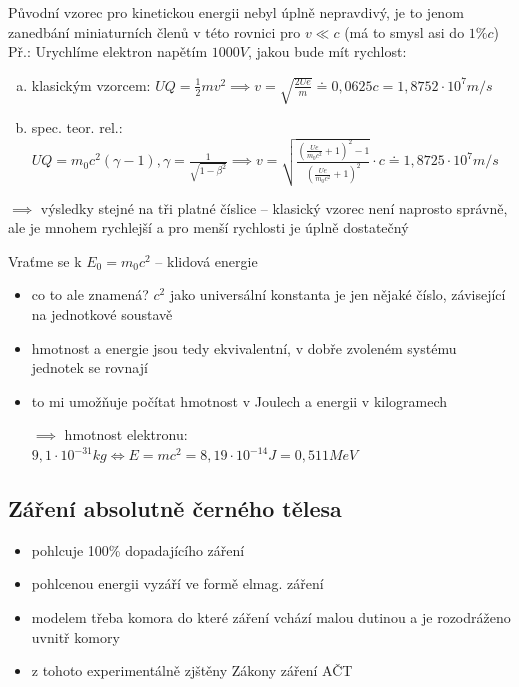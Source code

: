 \documentclass{article}
\begin{document}
Původní vzorec pro kinetickou energii nebyl úplně nepravdivý, je to jenom zanedbání miniaturních členů v této rovnici pro $v \ll c$ (má to smysl asi do $1\% c$)\\

Př.: Urychlíme elektron napětím $1000V$, jakou bude mít rychlost:
\begin{enumerate}[a.]
  \item klasickým vzorcem: $UQ = \frac{1}{2}mv^2 \implies v = \sqrt{\frac{2Ue}{m}} \doteq 0,0625 c = 1,8752 \cdot 10^7 m/s$
  \item spec. teor. rel.: $UQ = m_0 c^2 (\gamma - 1), \gamma = \frac{1}{\sqrt{1-\beta^2}} \implies v = \sqrt{\frac{(\frac{Ue}{m_0 c^2}+1)^2-1}{(\frac{Ue}{m_0 c^2}+1)^2}} \cdot c \doteq 1,8725 \cdot 10^7 m/s$
\end{enumerate}
$\implies$ výsledky stejné na tři platné číslice -- klasický vzorec není naprosto správně, ale je mnohem rychlejší a pro menší rychlosti je úplně dostatečný
\pagebreak

Vraťme se k $E_0 = m_0 c^2$ -- klidová energie
\begin{itemize}
  \item co to ale znamená? $c^2$ jako universální konstanta je jen nějaké číslo, závisející na jednotkové soustavě
  \item hmotnost a energie jsou tedy ekvivalentní, v dobře zvoleném systému jednotek se rovnají
  \item to mi umožňuje počítat hmotnost v Joulech a energii v kilogramech
  \item[$\implies$] hmotnost elektronu: $9,1 \cdot 10^{-31} kg \iff E = mc^2 = 8,19 \cdot 10^{-14} J = 0,511 MeV$
\end{itemize}

\subsection{Záření absolutně černého tělesa}
\begin{itemize}
    \item pohlcuje 100\% dopadajícího záření
    \item pohlcenou energii vyzáří ve formě elmag. záření
    \item modelem třeba komora do které záření vchází malou dutinou a je rozodráženo uvnitř komory
    \item z tohoto experimentálně zjštěny Zákony záření AČT
\end{itemize}
\end{document}
